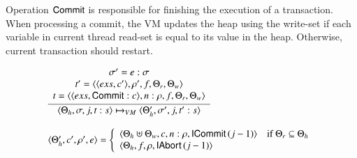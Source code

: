\documentclass[3p,times,procedia]{elsarticle}
\theoremstyle{definition}
\newcommand{\C}[1]{\red{\mathsf{#1}}}
\begin{document}
Operation \ensuremath{\C{Commit}} is responsible for finishing the execution of a transaction. When processing a commit, the VM
updates the heap using the write-set if each variable in current thread read-set is equal to its value in the heap.
Otherwise, current transaction should restart.

\[
\begin{array}{l}
  \infer
        {\langle \Theta_h,\sigma,j, t : s \rangle \mapsto_{VM}
         \langle \Theta_h',\sigma',j,t' : s \rangle}
        {\begin{array}{c}
            \sigma' = e : \sigma \\
            t' = \langle \langle exs, c'\rangle, \rho', f, \Theta_r,\Theta_w\rangle\\
            t = \langle \langle exs, \ensuremath{\C{Commit}} : c\rangle,n:\rho,f,\Theta_r,\Theta_w\rangle
         \end{array}} \\ \\
  \langle \Theta_h', c', \rho' , e \rangle
    = \left\{
         \begin{array}{ll}
            \langle \Theta_h \uplus \Theta_w, c, n : \rho, \ensuremath{\C{ICommit}}\,(j-1) \rangle & \text{if }\Theta_r\subseteq \Theta_h\\
            \langle \Theta_h, f, \rho, \ensuremath{\C{IAbort}}\,(j-1) \rangle
         \end{array}
      \right.
\end{array}
\]
\end{document}
